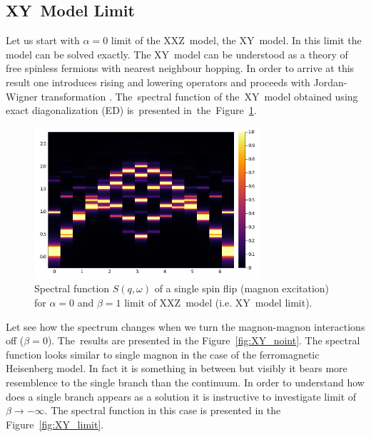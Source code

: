 \documentclass[12pt, a4paper]{article}
\begin{document}
\subsection{XY~Model Limit}\label{sec:XY_model}
Let us start with $\alpha = 0$ limit of the XXZ~model, the XY~model. In this limit the model can be solved exactly. The XY~model can be understood as a theory of free spinless fermions with nearest neighbour hopping. In order to arrive at this result one introduces rising and lowering operators and proceeds with Jordan-Wigner transformation \cite{JordanWigner}. The~spectral function of the~XY~model obtained using exact diagonalization (ED) is~presented in~the~Figure~\ref{fig:XY_int}.
\begin{figure}[ht]
	\centering
	\includegraphics[width=0.75\textwidth]{../figures/fig001.png}
	\caption{Spectral function $S(q,\omega)$ of a single spin flip (magnon excitation) for $\alpha = 0$ and $\beta = 1$ limit of XXZ~model (i.e. XY~model limit).}\label{fig:XY_int}
\end{figure}

Let see how the spectrum changes when we turn the magnon-magnon interactions off ($\beta = 0$). The~results are presented in the Figure~\ref{fig:XY_noint}. The spectral function looks similar to single magnon in the case of the ferromagnetic Heisenberg model. In fact it is something in between but visibly it bears more resemblence to the single branch than the continuum. In order to understand how does a single branch appears as a solution it is instructive to investigate limit of $\beta \to -\infty$. The spectral function in this case is presented in the Figure~\ref{fig:XY_limit}. 
\end{document}
